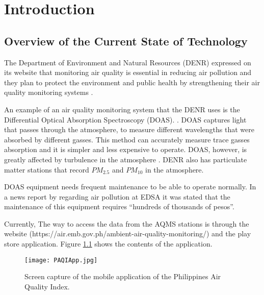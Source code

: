 \chapter{Introduction}
\label{sec:researchdesc}    %

\section{Overview of the Current State of Technology}
\label{sec:overview}
The Department of Environment and Natural Resources (DENR) expressed on its website that monitoring air quality is essential in reducing air pollution and they plan to protect the environment and public health by strengthening their air quality monitoring systems \cite{DENR2020}.

An example of an air quality monitoring system that the DENR uses is the Differential Optical Absorption Spectroscopy (DOAS). \cite{DENR_ND}. DOAS captures light that passes through the atmosphere, to measure different wavelengths that were absorbed by different gasses. This method can accurately measure trace gasses absorption and it is simpler and less expensive to operate. DOAS, however, is greatly affected by turbulence in the atmosphere \cite{PlattEtAl2008}. DENR also has particulate matter stations that record $PM_{2.5}$ and $PM_{10}$ in the atmosphere. \cite{DENR_ND}

DOAS equipment needs frequent maintenance to be able to operate normally. In a news report by \cite{enano_subingsubing_2019} regarding air pollution at EDSA it was stated that the maintenance of this equipment requires “hundreds of thousands of pesos”.

Currently, The way to access the data from the AQMS stations is through the website (https://air.emb.gov.ph/ambient-air-quality-monitoring/) and the play store application. Figure \ref{fig:PAQIApp} shows the contents of the application.\\

  
\begin{figure}[t]                %
   \centering                    %
   \texttt{[image: PAQIApp.jpg]}      %
   \caption{Screen capture of the mobile application of the Philippines Air Quality Index.
}
    \label{fig:PAQIApp}
\end{figure}


